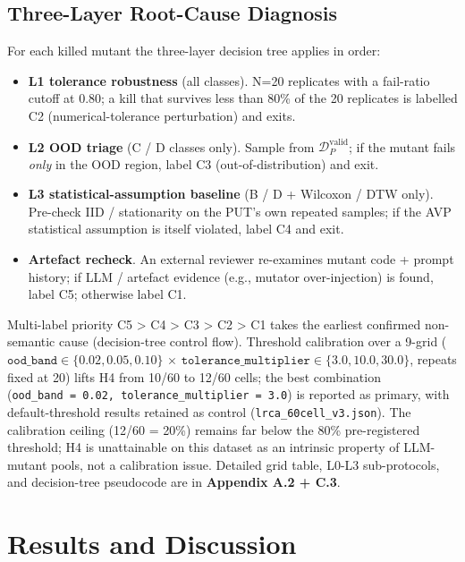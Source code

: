 \documentclass[manuscript,screen,review]{acmart}
\begin{document}
\subsection{Three-Layer Root-Cause Diagnosis}\label{lrca-three-layer-diagnosis}

For each killed mutant the three-layer decision tree applies in order:

\begin{itemize}

\item
  \textbf{L1 tolerance robustness} (all classes). N=20 replicates with a
  fail-ratio cutoff at 0.80; a kill that survives less than 80\% of the
  20 replicates is labelled C2 (numerical-tolerance perturbation) and
  exits.
\item
  \textbf{L2 OOD triage} (C / D classes only). Sample from
  $\mathcal{D}_P^{\mathrm{valid}}$; if the mutant fails \emph{only} in the OOD
  region, label C3 (out-of-distribution) and exit.
\item
  \textbf{L3 statistical-assumption baseline} (B / D + Wilcoxon / DTW
  only). Pre-check IID / stationarity on the PUT's own repeated samples;
  if the AVP statistical assumption is itself violated, label C4 and
  exit.
\item
  \textbf{Artefact recheck}. An external reviewer re-examines mutant
  code + prompt history; if LLM / artefact evidence (e.g., mutator
  over-injection) is found, label C5; otherwise label C1.
\end{itemize}

Multi-label priority C5 \textgreater{} C4 \textgreater{} C3
\textgreater{} C2 \textgreater{} C1 takes the earliest confirmed
non-semantic cause (decision-tree control flow). Threshold calibration
over a 9-grid ($\texttt{ood\_band} \in \{0.02, 0.05, 0.10\}$ $\times$
$\texttt{tolerance\_multiplier} \in \{3.0, 10.0, 30.0\}$, repeats fixed
at 20) lifts H4 from 10/60 to 12/60 cells; the best combination
(\texttt{ood\_band\ =\ 0.02,\ tolerance\_multiplier\ =\ 3.0}) is
reported as primary, with default-threshold results retained as control
(\texttt{lrca\_60cell\_v3.json}). The calibration ceiling (12/60 = 20\%)
remains far below the 80\% pre-registered threshold; H4 is unattainable
on this dataset as an intrinsic property of LLM-mutant pools, not a
calibration issue. Detailed grid table, L0-L3 sub-protocols, and
decision-tree pseudocode are in \textbf{Appendix A.2 + C.3}.


\section{Results and Discussion}\label{statistical-analysis-and-empirical-results}
\end{document}
